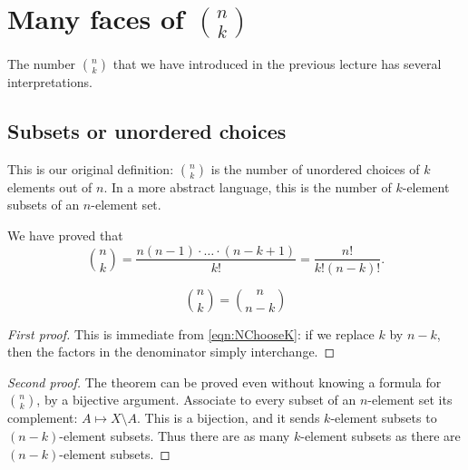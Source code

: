 \begin{page}
\setcounter{section}{3}
\setcounter{subsection}{1}
\setcounter{dfn}{0}
\label{portion:71}

\section{Many faces of $\binom{n}{k}$}
The number $\binom{n}{k}$ that we have introduced in the previous lecture has several interpretations.

\end{page}

\begin{page}
\setcounter{section}{3}
\setcounter{subsection}{1}
\setcounter{dfn}{0}
\label{portion:73}

\subsection{Subsets or unordered choices}
This is our original definition: $\binom{n}{k}$ is the number of unordered choices of $k$ elements out of $n$.
In a more abstract language, this is the number of $k$-element subsets of an $n$-element set.

We have proved that
\begin{equation}
\label{eqn:NChooseK}
\binom{n}{k} = \frac{n(n-1)\cdot \ldots \cdot (n-k+1)}{k!} = \frac{n!}{k!(n-k)!}.
\end{equation}


\end{page}

\begin{page}
\setcounter{section}{3}
\setcounter{subsection}{1}
\setcounter{dfn}{1}
\label{portion:75}

\begin{thm}
\[
\binom{n}{k} = \binom{n}{n-k}
\]
\end{thm}

\end{page}

\begin{page}
\setcounter{section}{3}
\setcounter{subsection}{1}
\setcounter{dfn}{1}
\label{portion:76}

\begin{proof}[First proof]
This is immediate from \eqref{eqn:NChooseK}: if we replace $k$ by $n-k$, then the factors in the denominator simply interchange.
\end{proof}
\begin{proof}[Second proof]
The theorem can be proved even without knowing a formula for $\binom{n}{k}$, by a bijective argument.
Associate to every subset of an $n$-element set its complement: $A \mapsto X \setminus A$.
This is a bijection, and it sends $k$-element subsets to $(n-k)$-element subsets.
Thus there are as many $k$-element subsets as there are $(n-k)$-element subsets.
\end{proof}


\end{page}

